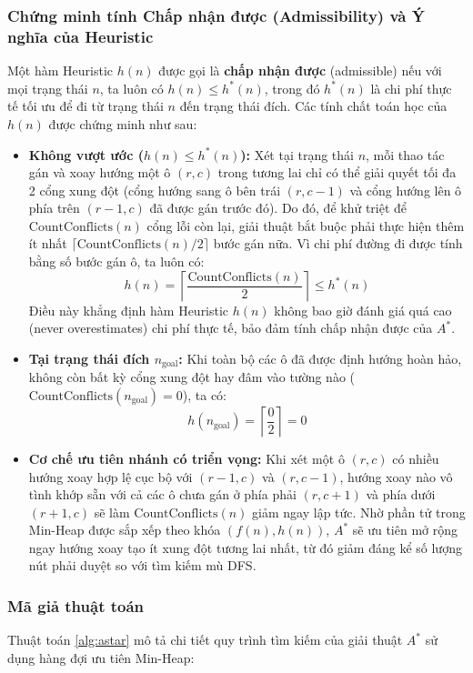 \documentclass[a4paper]{article}
\begin{document}
\subsubsection{Chứng minh tính Chấp nhận được (Admissibility) và Ý nghĩa của Heuristic}
Một hàm Heuristic $h(n)$ được gọi là \textbf{chấp nhận được} (admissible) nếu với mọi trạng thái $n$, ta luôn có $h(n) \le h^*(n)$, trong đó $h^*(n)$ là chi phí thực tế tối ưu để đi từ trạng thái $n$ đến trạng thái đích. Các tính chất toán học của $h(n)$ được chứng minh như sau:
\begin{itemize}
    \item \textbf{Không vượt ước ($h(n) \le h^*(n)$):} Xét tại trạng thái $n$, mỗi thao tác gán và xoay hướng một ô $(r, c)$ trong tương lai chỉ có thể giải quyết tối đa 2 cổng xung đột (cổng hướng sang ô bên trái $(r, c-1)$ và cổng hướng lên ô phía trên $(r-1, c)$ đã được gán trước đó). Do đó, để khử triệt để $\text{CountConflicts}(n)$ cổng lỗi còn lại, giải thuật bắt buộc phải thực hiện thêm ít nhất $\lceil \text{CountConflicts}(n) / 2 \rceil$ bước gán nữa. Vì chi phí đường đi được tính bằng số bước gán ô, ta luôn có:
    \begin{equation}
        h(n) = \left\lceil \frac{\text{CountConflicts}(n)}{2} \right\rceil \le h^*(n)
    \end{equation}
    Điều này khẳng định hàm Heuristic $h(n)$ không bao giờ đánh giá quá cao (never overestimates) chi phí thực tế, bảo đảm tính chấp nhận được của $A^*$.
    \item \textbf{Tại trạng thái đích $n_{\text{goal}}$:} Khi toàn bộ các ô đã được định hướng hoàn hảo, không còn bất kỳ cổng xung đột hay đâm vào tường nào ($\text{CountConflicts}(n_{\text{goal}}) = 0$), ta có:
    \begin{equation}
        h(n_{\text{goal}}) = \left\lceil \frac{0}{2} \right\rceil = 0
    \end{equation}
    \item \textbf{Cơ chế ưu tiên nhánh có triển vọng:} Khi xét một ô $(r, c)$ có nhiều hướng xoay hợp lệ cục bộ với $(r-1, c)$ và $(r, c-1)$, hướng xoay nào vô tình khớp sẵn với cả các ô chưa gán ở phía phải $(r, c+1)$ và phía dưới $(r+1, c)$ sẽ làm $\text{CountConflicts}(n)$ giảm ngay lập tức. Nhờ phần tử trong Min-Heap được sắp xếp theo khóa $(f(n), h(n))$, $A^*$ sẽ ưu tiên mở rộng ngay hướng xoay tạo ít xung đột tương lai nhất, từ đó giảm đáng kể số lượng nút phải duyệt so với tìm kiếm mù DFS.
\end{itemize}

\subsubsection{Mã giả thuật toán}
Thuật toán \ref{alg:astar} mô tả chi tiết quy trình tìm kiếm của giải thuật $A^*$ sử dụng hàng đợi ưu tiên Min-Heap:
\end{document}
